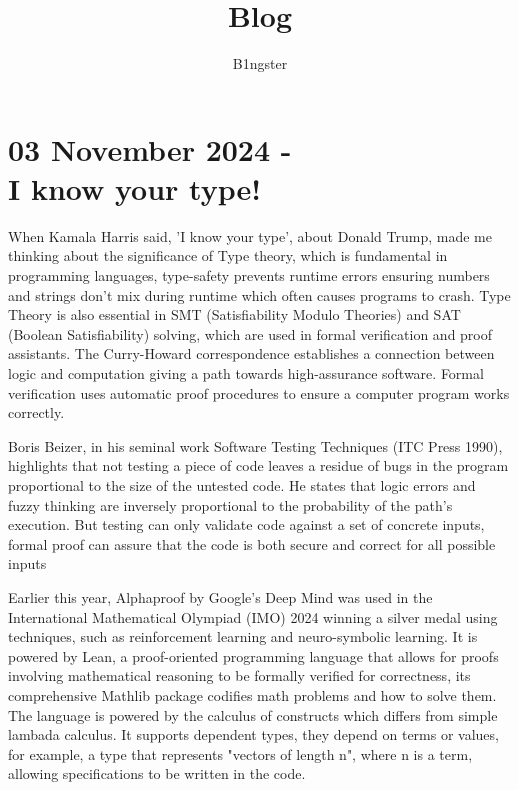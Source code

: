 \documentclass{article}
\title{Blog}
\author{B1ngster}
\date{}
\begin{document}
\maketitle
\newpage
 
\section*{03 November 2024 - \\ I know your type! }

When Kamala Harris said, 'I know your type', about Donald Trump, made me thinking about the significance of Type theory, which is fundamental in programming languages, type-safety prevents runtime errors ensuring numbers and strings don't mix during runtime which often causes programs to crash. Type Theory is also essential in SMT (Satisfiability Modulo Theories) and SAT (Boolean Satisfiability) solving, which are used in formal verification and proof assistants.  The Curry-Howard correspondence establishes a connection between logic and computation giving a path towards high-assurance software. Formal verification uses automatic proof procedures to ensure a computer program works correctly. 

Boris Beizer, in his seminal work Software Testing Techniques (ITC Press 1990), highlights that not testing a piece of code leaves a residue of bugs in the program proportional to the size of the untested code. He states that logic errors and fuzzy thinking are inversely proportional to the probability of the path’s execution. But testing can only validate code against a set of concrete inputs, formal proof can assure that the code is both secure and correct for all possible inputs

Earlier this year, Alphaproof by Google's Deep Mind was used in the International Mathematical Olympiad (IMO) 2024 winning a silver medal using techniques, such as reinforcement learning and neuro-symbolic learning.  It is powered by Lean, a proof-oriented programming language that allows for proofs involving mathematical reasoning to be formally verified for correctness, its comprehensive Mathlib package codifies math problems and how to solve them. The language is powered by the calculus of constructs which differs from simple lambada calculus. It supports dependent types, they depend on terms or values, for example, a type that represents "vectors of length n", where n is a term, allowing specifications to be written in the code. 
\end{document}
